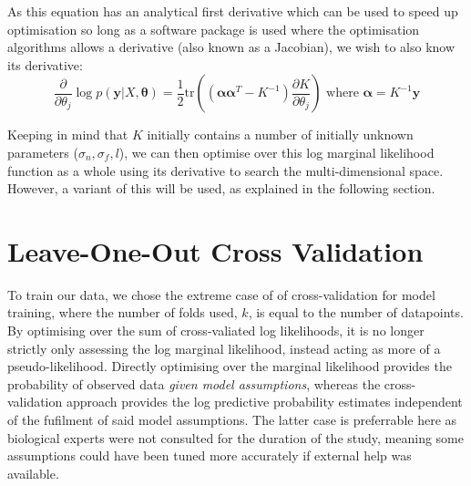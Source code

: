 As this equation has an analytical first derivative which can be used to speed up optimisation so long as a software package is used where the optimisation algorithms allows a derivative (also known as a Jacobian), we wish to also know its derivative:
\begin{equation}
    \frac{\partial}{\partial\theta_j} \log p(\mathbf{y}|X,\mathbf{\theta}) = \frac{1}{2} \text{tr}((\mathbf{\alpha\alpha}^T - K^{-1}) \frac{\partial K}{\partial \theta_j}) \text{ where } \mathbf{\alpha} = K^{-1}\mathbf{y}
\end{equation}

Keeping in mind that $K$ initially contains a number of initially unknown parameters ($\sigma_n, \sigma_f, l$), we can then optimise over this log marginal likelihood function as a whole using its derivative to search the multi-dimensional space. However, a variant of this will be used, as explained in the following section.

% 

\section{Leave-One-Out Cross Validation}


To train our data, we chose the extreme case of of cross-validation for model training, where the number of folds used, $k$, is equal to the number of datapoints. By optimising over the sum of cross-valiated log likelihoods, it is no longer strictly only assessing the log marginal likelihood, instead acting as more of a pseudo-likelihood. Directly optimising over the marginal likelihood provides the probability of observed data \textit{given model assumptions}, whereas the cross-validation approach provides the log predictive probability estimates independent of the fufilment of said model assumptions. The latter case is preferrable here as biological experts were not consulted for the duration of the study, meaning some assumptions could have been tuned more accurately if external help was available.

